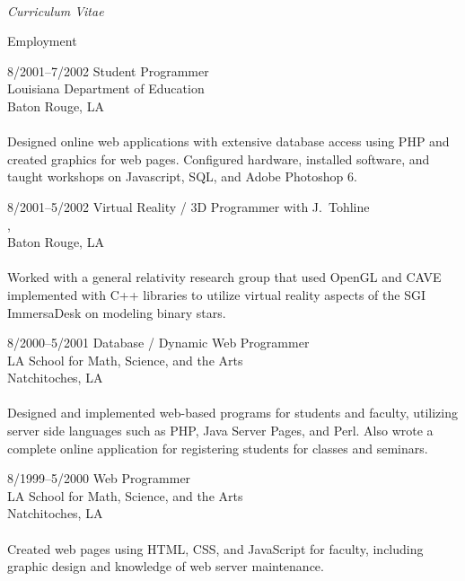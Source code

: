 \documentclass[10pt]{article}
\begin{document}
\begin{cv}{\name\\{\large \itshape Curriculum Vitae}}
\begin{cvlist}{Employment}
	\item[8/2001--7/2002] Student Programmer\\
	Louisiana Department of Education\\
	Baton Rouge, LA\\
	\\
	Designed online web applications with extensive database access using PHP and 
	created graphics for web pages. Configured hardware, installed software, 
	and taught workshops on Javascript, SQL, and Adobe Photoshop 6.
	
	\item[8/2001--5/2002] Virtual Reality / 3D Programmer with J.~Tohline\\
	\institute, \dept\\
	Baton Rouge, LA\\
	\\
	Worked with a general relativity research group that used OpenGL and
	CAVE implemented with C++ libraries to utilize virtual reality aspects of
	the SGI ImmersaDesk on modeling binary stars.
	
	\item[8/2000--5/2001] Database / Dynamic Web Programmer\\
	LA School for Math, Science, and the Arts\\
	Natchitoches, LA\\
	\\
	Designed and implemented web-based programs for students and faculty,
	utilizing server side languages such as PHP, Java Server Pages, and Perl.
	Also wrote a complete online application for registering students for classes and seminars.
	
	\item[8/1999--5/2000] Web Programmer\\
	LA School for Math, Science, and the Arts\\
	Natchitoches, LA\\
	\\
	Created web pages using HTML, CSS, and JavaScript for faculty, including
	graphic design and knowledge of web server maintenance.
\end{cvlist}

\setlength{\oldcvlabelwidth}{\cvlabelwidth}
\setlength{\cvlabelwidth}{1em}
\renewcommand*{\bibindent}{1.5em}
\newcommand*{\biblabelsep}{1.5em}


\end{cv}
\end{document}
